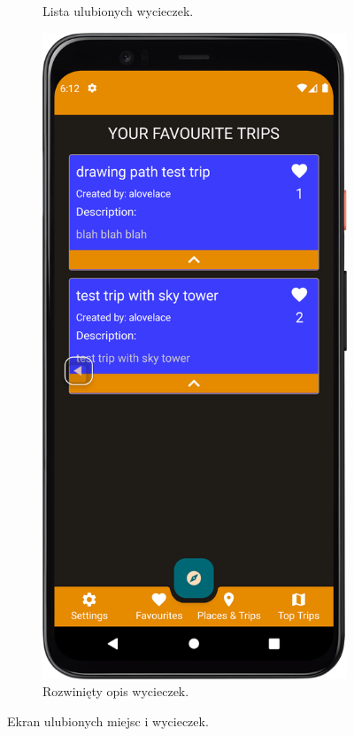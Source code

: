 \begin{figure}[H]
\begin{subfigure}[b]{0.3\textwidth}
                \caption{Lista ulubionych wycieczek.\label{fav_trip1}}
            \end{subfigure}
            \hfill
            \begin{subfigure}[b]{0.3\textwidth}
                \centering
                \includegraphics[width=\textwidth]{src/app/fav_trips2.png}
                \caption{Rozwinięty opis wycieczek.\label{fav_trip2}}
            \end{subfigure}
            \caption{Ekran ulubionych miejsc i wycieczek.\label{fav}}
            \qquad
        \end{figure} 
        
